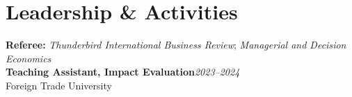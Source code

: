 \documentclass[10pt]{article}
\begin{document}
\section{Leadership \& Activities}
\textbf{Referee:} \textit{Thunderbird International Business Review}; \textit{Managerial and Decision Economics}\\
\textbf{Teaching Assistant, Impact Evaluation}\hfill\emph{2023--2024}\\
Foreign Trade University
\end{document}
